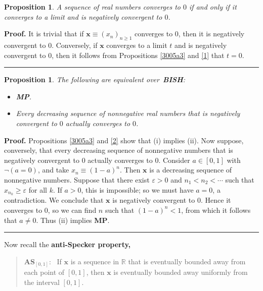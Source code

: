 \documentclass[11pt]{article}%
\newtheorem{proposition}[theorem]{Proposition}
\newenvironment{proof}[1][Proof]{\noindent\textbf{#1.} }{\ \rule{0.5em}{0.5em}}
\begin{document}
\begin{proposition}
\label{3005a1}A sequence of real numbers converges to $0$ if and only if it
converges to a limit and is negatively convergent to $0$.
\end{proposition}

\begin{proof}
It is trivial that if $\mathbf{x}\equiv\left(  x_{n}\right)  _{n\geqslant1}$
converges to $0$, then it is negatively convergent to $0$. Conversely, if
$\mathbf{x}$ converges to a limit $t$ and is negatively convergent to $0$,
then it follows from Propositions \ref{3005a3} and \ref{1} that $t=0$.
\end{proof}

\begin{proposition}
\label{3005a2}The following are equivalent over\emph{\ \textbf{BISH}}:

\begin{itemize}
\item[\emph{(i)}] \emph{\textbf{MP}}.

\item[\emph{(ii)}] Every decreasing sequence of nonnegative real numbers that
is negatively convergent to $0$ actually converges to $0$.
\end{itemize}
\end{proposition}

\begin{proof}
Propositions \ref{3005a3} and \ref{2} show that (i) implies (ii). Now suppose,
conversely, that every decreasing sequence of nonnegative numbers that is
negatively convergent to $0$ actually converges to $0$. Consider $a\in\left[
0,1\right]  $ with $\lnot\left(  a=0\right)  $, and take $x_{n}\equiv
(1-a)^{n}$. Then $\mathbf{x}$ is a decreasing sequence of nonnegative numbers.
Suppose that there exist $\varepsilon>0$ and $n_{1}<n_{2}<\cdots$ such that
$x_{n_{k}}\geqslant\varepsilon$ for all $k$. If $a>0$, this is impossible; so
we must have $a=0$, a contradiction. We conclude that $\mathbf{x}$ is
negatively convergent to $0$. Hence it converges to $0$, so we can find $n$
such that $\left(  1-a\right)  ^{n}<1$, from which it follows that $a\neq0$.
Thus (ii) implies \textbf{MP}.
\end{proof}

Now recall the \textbf{anti-Specker property,}

\begin{quote}
\textbf{AS}$_{\left[  0,1\right]  }$: \ If $\mathbf{x}$ is a sequence in
$\mathbb{R}$ that is eventually bounded away from each point of $\left[
0,1\right]  $, then $\mathbf{x}$ is eventually bounded away uniformly from the
interval $\left[  0,1\right]  $.
\end{quote}%
\end{document}
